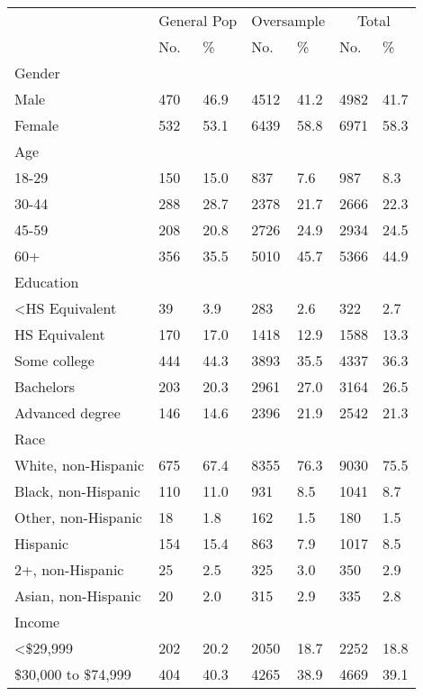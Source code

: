 \captionsetup[table]{labelformat=empty,skip=1pt}
\begin{longtable}{lllllll}
\toprule
& \multicolumn{2}{c}{General Pop} & \multicolumn{2}{c}{Oversample} & \multicolumn{2}{c}{Total} \\ 
 \cmidrule(lr){2-3}\cmidrule(lr){4-5}\cmidrule(lr){6-7}
 & No. & \% & No. & \% & No. & \% \\ 
\midrule
\multicolumn{1}{l}{Gender} \\ 
\midrule
Male & 470 & 46.9 & 4512 & 41.2 & 4982 & 41.7 \\ 
Female & 532 & 53.1 & 6439 & 58.8 & 6971 & 58.3 \\ 
\midrule
\multicolumn{1}{l}{Age} \\ 
\midrule
18-29 & 150 & 15.0 & 837 & 7.6 & 987 & 8.3 \\ 
30-44 & 288 & 28.7 & 2378 & 21.7 & 2666 & 22.3 \\ 
45-59 & 208 & 20.8 & 2726 & 24.9 & 2934 & 24.5 \\ 
60+ & 356 & 35.5 & 5010 & 45.7 & 5366 & 44.9 \\ 
\midrule
\multicolumn{1}{l}{Education} \\ 
\midrule
<HS Equivalent & 39 & 3.9 & 283 & 2.6 & 322 & 2.7 \\ 
HS Equivalent & 170 & 17.0 & 1418 & 12.9 & 1588 & 13.3 \\ 
Some college & 444 & 44.3 & 3893 & 35.5 & 4337 & 36.3 \\ 
Bachelors & 203 & 20.3 & 2961 & 27.0 & 3164 & 26.5 \\ 
Advanced degree & 146 & 14.6 & 2396 & 21.9 & 2542 & 21.3 \\ 
\midrule
\multicolumn{1}{l}{Race} \\ 
\midrule
White, non-Hispanic & 675 & 67.4 & 8355 & 76.3 & 9030 & 75.5 \\ 
Black, non-Hispanic & 110 & 11.0 & 931 & 8.5 & 1041 & 8.7 \\ 
Other, non-Hispanic & 18 & 1.8 & 162 & 1.5 & 180 & 1.5 \\ 
Hispanic & 154 & 15.4 & 863 & 7.9 & 1017 & 8.5 \\ 
2+, non-Hispanic & 25 & 2.5 & 325 & 3.0 & 350 & 2.9 \\ 
Asian, non-Hispanic & 20 & 2.0 & 315 & 2.9 & 335 & 2.8 \\ 
\midrule
\multicolumn{1}{l}{Income} \\ 
\midrule
<\$29,999 & 202 & 20.2 & 2050 & 18.7 & 2252 & 18.8 \\ 
\$30,000 to \$74,999 & 404 & 40.3 & 4265 & 38.9 & 4669 & 39.1 \\ 

\end{longtable}
